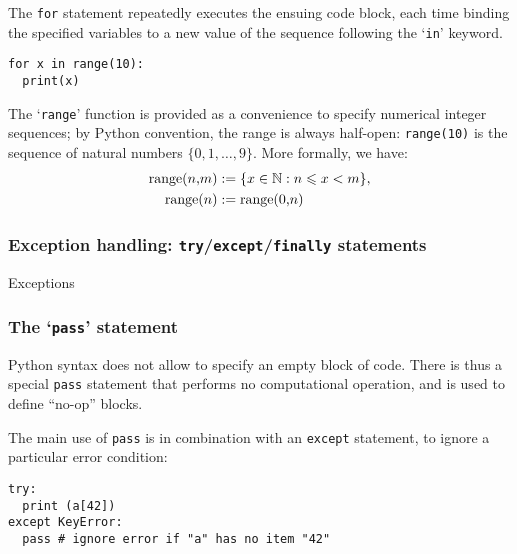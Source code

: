 The \lstinline{for} statement repeatedly executes the ensuing code block,
each time binding the specified variables to a new value of the
sequence following the `\lstinline{in}' keyword.
\begin{lstlisting}
for x in range(10):
  print(x)
\end{lstlisting}
The `\lstinline{range}' function is provided as a convenience to specify
numerical integer sequences; by Python convention, the range is always
half-open: \verb"range(10)" is the sequence of natural numbers $\{0,
1, \ldots, 9\}$.  More formally, we have:
\begin{align*}
  \text{\lstinline{range}($n$,$m$)} &:= \{ x \in \setN : n \leq x < m \},
  \\
  \text{\lstinline{range}($n$)} &:= \text{range(0,$n$)}
\end{align*}

\subsubsection{Exception handling: \lstinline{try}/\lstinline{except}/\lstinline{finally} statements}
\label{sec:try-except-finally}

Exceptions 

\subsubsection{The `{\lstinline{pass}}' statement}
\label{sec:pass}

Python syntax does not allow to specify an empty block of code. There
is thus a special \lstinline{pass} statement that performs no
computational operation, and is used to define ``no-op'' blocks.

The main use of \lstinline{pass} is in combination with an
\lstinline{except} statement, to ignore a particular error condition:
\begin{lstlisting}
try:
  print (a[42])
except KeyError:
  pass # ignore error if "a" has no item "42"
\end{lstlisting}






